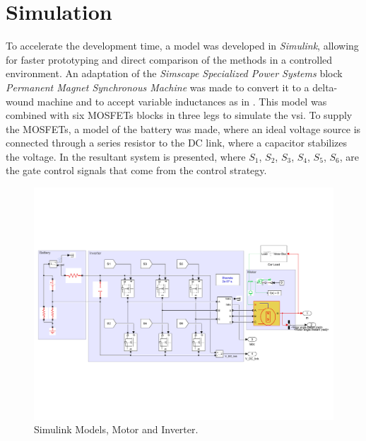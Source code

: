 
\section{Simulation}
\label{section:simulation}%
\vfill

To accelerate the development time, a model was developed in \textit{Simulink}, allowing for faster prototyping and direct comparison of the methods in a controlled environment. An adaptation of the \textit{Simscape Specialized Power Systems} block \textit{Permanent Magnet Synchronous Machine} was made to convert it to a delta-wound machine and to accept variable inductances as in . 
This model was combined with six MOSFETs blocks in three legs to simulate the \gls{vsi}. To supply the MOSFETs, a model of the battery was made, where an ideal voltage source is connected through a series resistor to the DC link, where a capacitor stabilizes the voltage. In  the resultant system is presented, where $S_1$, $S_2$, $S_3$, $S_4$, $S_5$, $S_6$, are the gate control signals that come from the control strategy.

\begin{figure}[!htb]
	\centering
		\includegraphics[clip, trim=0.3cm 5cm 0.5cm 5cm, width=1.00\textwidth]{Figures/motor_and_inverter_simulink1.pdf}
	\caption[Simulink Models, Motor and Inverter.]{Simulink Models, Motor and Inverter.}
	\label{fig:simulation_model} %
\end{figure}


